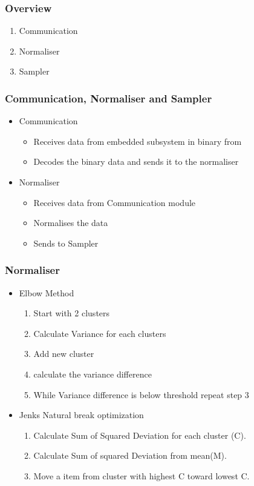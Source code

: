 \begin{frame}
        \frametitle{Overview}
        \begin{enumerate}
            \item Communication
            \item Normaliser
            \item Sampler
        \end{enumerate}
\end{frame}
\begin{frame}
	\frametitle{Communication, Normaliser and Sampler}
	\begin{itemize}
		\item Communication
\begin{itemize}
\item Receives data from embedded subsystem in binary from
\item Decodes the binary data and sends it to the normaliser
\end{itemize}
\item Normaliser
  \begin{itemize}
\item Receives data from Communication module
\item Normalises the data
\item Sends to Sampler
\end{itemize}

	\end{itemize}
 
\end{frame}
\begin{frame}
\frametitle{Normaliser}
\begin{itemize}
\item Elbow Method \begin{enumerate}
    \item Start with 2 clusters
    \item Calculate Variance for each clusters
    \item Add new cluster
    \item calculate the variance difference
    \item While Variance difference is below threshold repeat step 3 
\end{enumerate}
\item Jenks Natural break optimization
\begin{enumerate}
\item Calculate Sum of Squared Deviation for each cluster (C).
\item Calculate Sum of squared Deviation from mean(M).
\item Move a item from cluster with highest C toward lowest C.
\end{enumerate}
\end{itemize}
\end{frame}
